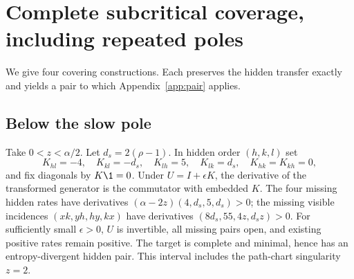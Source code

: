\section{Complete subcritical coverage, including repeated poles}\label{app:subcritical}
We give four covering constructions. Each preserves the hidden transfer exactly and yields a pair to which Appendix~\ref{app:pair} applies.

\subsection{Below the slow pole}
Take $0<z<\alpha/2$. Let $d_s=2(\rho-1)$. In hidden order $(h,k,l)$ set
\begin{equation}
 K_{hl}=-4,\quad K_{kl}=-d_s,\quad K_{lh}=5,\quad K_{lk}=d_s,\quad
 K_{hk}=K_{kh}=0,
\end{equation}
and fix diagonals by $K\1=0$. Under $U=I+\epsilon K$, the derivative of the transformed generator is the commutator with embedded $K$. The four missing hidden rates have derivatives $(\alpha-2z)(4,d_s,5,d_s)>0$; the missing visible incidences $(xk,yh,hy,kx)$ have derivatives $(8d_s,55,4z,d_sz)>0$. For sufficiently small $\epsilon>0$, $U$ is invertible, all missing pairs open, and existing positive rates remain positive. The target is complete and minimal, hence has an entropy-divergent hidden pair. This interval includes the path-chart singularity $z=2$.

